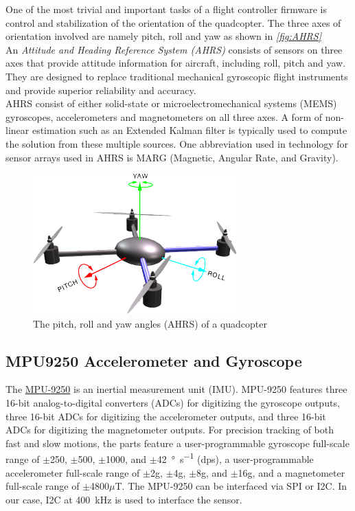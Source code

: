 \documentclass[a4paper,12pt,oneside]{book}
\begin{document}
One of the most trivial and important tasks of a flight controller firmware is control and stabilization of the orientation of the quadcopter. The three axes of orientation involved are namely pitch, roll and yaw as shown in \textit{\autoref{fig:AHRS}}\\

An \textit{Attitude and Heading Reference System (AHRS)} consists of sensors on three axes that provide attitude information for aircraft, including roll, pitch and yaw. They are designed to replace traditional mechanical gyroscopic flight instruments and provide superior reliability and accuracy.\cite{ahrswiki}\\

AHRS consist of either solid-state or microelectromechanical systems (MEMS) gyroscopes, accelerometers and magnetometers on all three axes. A form of non-linear estimation such as an Extended Kalman filter is typically used to compute the solution from these multiple sources. One abbreviation used in technology for sensor arrays used in AHRS is MARG (Magnetic, Angular Rate, and Gravity).\cite{ahrswiki}\\

\begin{figure}[!htb]
\centering
\includegraphics[width=0.7\textwidth]{images/AHRS}
\caption{The pitch, roll and yaw angles (AHRS) of a quadcopter\cite{ardu}}
\label{fig:AHRS}
\end{figure}

\subsection{MPU9250 Accelerometer and Gyroscope}
The \href{./datasheets/MPU9250 Datasheet.pdf}{MPU-9250} is an inertial measurement unit (IMU). MPU-9250 features three 16-bit analog-to-digital converters (ADCs) for digitizing the gyroscope outputs, three 16-bit ADCs for digitizing the accelerometer outputs, and three 16-bit ADCs for digitizing the magnetometer outputs. For precision tracking of both fast and slow motions, the parts feature a user-programmable gyroscope full-scale range of $\pm$250, $\pm$500, $\pm$1000, and $\pm$\SI{42}{\degree\per\second} (dps), a user-programmable accelerometer full-scale range of $\pm$2g, $\pm$4g, $\pm$8g, and $\pm$16g, and a magnetometer full-scale range of $\pm$4800$\mu$T. The MPU-9250 can be interfaced via SPI or I2C. In our case, I2C at \SI{400}{\kilo\hertz} is used to interface the sensor.
\end{document}
